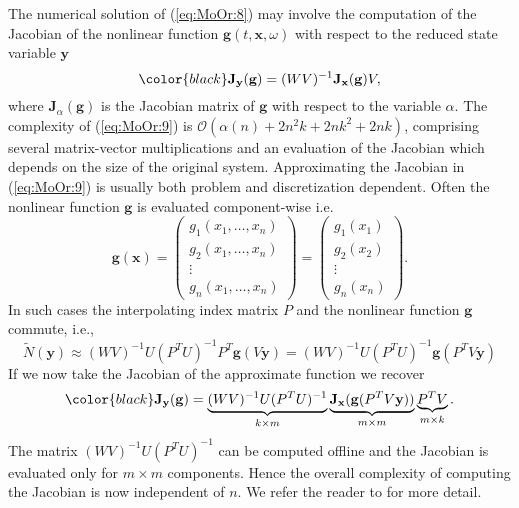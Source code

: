 \documentclass[final]{siamart}
\begin{document}
{{\color{black}} The numerical solution of (\ref{eq:MoOr:8}) may involve the computation of the Jacobian of the nonlinear function $\mathbf g(t,\mathbf x, \omega)$ with respect to the reduced state variable $\mathbf y$}
\begin{equation} \label{eq:MoOr:9}
	{\color{black}} \mathbf J_{\mathbf y}(\mathbf g) = (WV)^{-1} \mathbf J_{\mathbf x}(\mathbf g) V,
\end{equation}
{{\color{black}} where $\mathbf J_\alpha(\mathbf g)$ is the Jacobian matrix of $\mathbf g$ with respect to the variable $\alpha$.} The complexity of (\ref{eq:MoOr:9}) is $\mathcal{O}(\alpha(n) +2n^2k+2nk^2+2nk)$, comprising several matrix-vector multiplications and an evaluation of the Jacobian which depends on the size of the original system. Approximating the Jacobian in (\ref{eq:MoOr:9}) is usually both problem and discretization dependent. Often the nonlinear function $\mathbf g$ is evaluated component-wise i.e.
\begin{equation} \label{eq:MoOr:15}
	\mathbf g(\mathbf x) =
	\begin{pmatrix}
		g_1(x_1,\dots,x_n) \\
		g_2(x_1,\dots,x_n) \\
		\vdots \\
		g_n(x_1,\dots,x_n)
	\end{pmatrix}
	=
	\begin{pmatrix}
		g_1(x_1) \\
		g_2(x_2) \\
		\vdots \\
		g_n(x_n)
	\end{pmatrix}.
\end{equation}
In such cases the interpolating index matrix $P$ and the nonlinear function $\mathbf g$ commute, i.e.,
\begin{equation} \label{eq:MoOr:16}
	\tilde N(\mathbf y) \approx (WV)^{-1} U(P^TU)^{-1}P^T \mathbf g(V\mathbf y) = (WV)^{-1} U(P^TU)^{-1}\mathbf g(P^TV\mathbf y)
\end{equation}
If we now take the Jacobian of the approximate function we recover
\begin{equation}
	{\color{black}} \mathbf J_{\mathbf y}(\mathbf g) = \underbrace{ (WV)^{-1} U(P^TU)^{-1} }_{k\times m} \underbrace{ \mathbf J_{\mathbf x}(\mathbf g(P^T V \mathbf y) ) }_{m\times m} \underbrace{P^T V}_{m\times k}.
\end{equation}
The matrix $(WV)^{-1} U(P^TU)^{-1}$ can be computed offline and the Jacobian is evaluated only for $m\times m$ components. Hence the overall complexity of computing the Jacobian is now independent of $n$. {{\color{black}} We refer the reader to \cite{Barrault:2004kz,Chaturantabut:2010cz} for more detail.}
\end{document}
